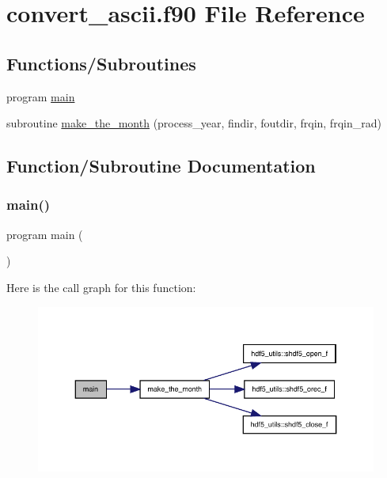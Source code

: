\hypertarget{convert__ascii_8f90}{}\section{convert\+\_\+ascii.\+f90 File Reference}
\label{convert__ascii_8f90}
\subsection*{Functions/\+Subroutines}
\begin{DoxyCompactItemize}
\item 
program \hyperlink{convert__ascii_8f90_a8ec2266d83cd6c0b762cbcbc92c0af3d}{main}
\item 
subroutine \hyperlink{convert__ascii_8f90_a4c40e1c4ea890a51cd138db74efd2c6c}{make\+\_\+the\+\_\+month} (process\+\_\+year, findir, foutdir, frqin, frqin\+\_\+rad)
\end{DoxyCompactItemize}


\subsection{Function/\+Subroutine Documentation}
\mbox{\label{convert__ascii_8f90_a8ec2266d83cd6c0b762cbcbc92c0af3d}} 
\subsubsection{\texorpdfstring{main()}{main()}}
{\footnotesize\ttfamily program main (\begin{DoxyParamCaption}{ }\end{DoxyParamCaption})}

Here is the call graph for this function\+:
\nopagebreak
\begin{figure}[H]
\begin{center}
\leavevmode
\includegraphics[width=350pt]{convert__ascii_8f90_a8ec2266d83cd6c0b762cbcbc92c0af3d_cgraph}
\end{center}
\end{figure}
\mbox{\label{convert__ascii_8f90_a4c40e1c4ea890a51cd138db74efd2c6c}} 
